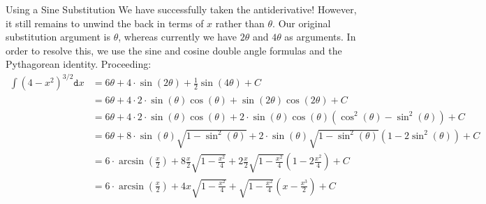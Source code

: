 \begin{example}{Using a Sine Substitution}
We have successfully taken the antiderivative!  However, it still remains to unwind the  back in terms of $x$ rather than $\theta$.  Our original substitution argument is $\theta$, whereas currently we have $2\theta $ and $4\theta $ as arguments.  In order to resolve this, we use the sine and cosine double angle formulas and the Pythagorean identity.  Proceeding:
\begin{align*} \int \left( 4-x^2 \right)^{3/2} \mathtt{d}x &=6\theta +4\cdot \sin(2\theta) +\frac{1}{2}\sin(4\theta)+C \\
&=6\theta +4\cdot 2\cdot \sin(\theta)\cos(\theta) + \sin(2\theta)\cos(2\theta)+C \\
&=6\theta +4\cdot 2\cdot \sin(\theta)\cos(\theta) +2\cdot \sin(\theta)\cos(\theta)\left(\cos^2(\theta)-\sin^2(\theta)\right)+C \\
&=6\theta +8\cdot \sin(\theta)\sqrt{1-\sin^2(\theta)} +2\cdot \sin(\theta)\sqrt{1-\sin^2(\theta)}\left(1-2\sin^2(\theta)\right)+C \\
&=6\cdot \arcsin\left(\frac{x}{2}\right)+8\frac{x}{2}\sqrt{1-\frac{x^2}{4}}+2\frac{x}{2}\sqrt{1-\frac{x^2}{4}}\left(1-2\frac{x^2}{4}\right)+C \\
&=6\cdot \arcsin\left(\frac{x}{2}\right)+4x\sqrt{1-\frac{x^2}{4}}+\sqrt{1-\frac{x^2}{4}}\left(x-\frac{x^3}{2}\right)+C
\end{align*}

\end{example}
